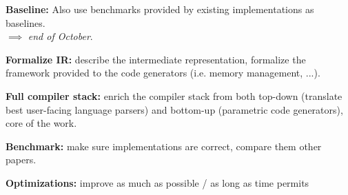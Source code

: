 \item \textbf{Baseline:} Also use benchmarks provided by existing implementations as baselines.\\
$\implies$ \emph{end of October}.

\item \textbf{Formalize IR:} describe the intermediate representation, formalize the framework provided to the code generators (i.e. memory management, ...).
\item \textbf{Full compiler stack:} enrich the compiler stack from both top-down (translate best user-facing language parsers) and bottom-up (parametric code generators), core of the work.
\item \textbf{Benchmark:} make sure implementations are correct, compare them other papers.
\item \textbf{Optimizations:} improve as much as possible / as long as time permits
\ole






